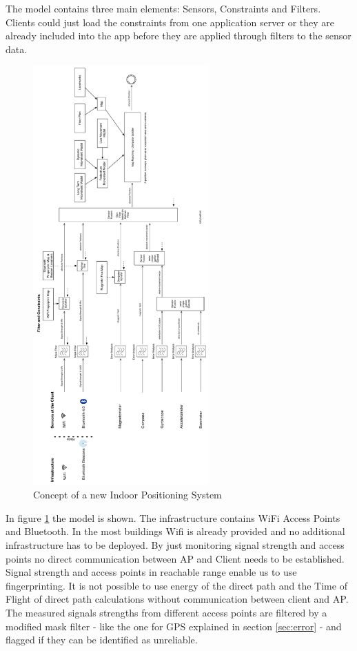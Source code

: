 The model contains three main elements: Sensors, Constraints and Filters. Clients could just load the constraints from one application server or they are already included into the app before they are applied through filters to the sensor data. 

\begin{figure}
	\centering
		\includegraphics[width=0.6\textwidth]{images/Final_Positioning_system.pdf}
	\caption{Concept of a new Indoor Positioning System}
	\label{fig:ips}
\end{figure}

In figure \ref{fig:ips} the model is shown. The infrastructure contains WiFi Access Points and Bluetooth. In the most buildings Wifi is already provided and no additional infrastructure has to be deployed. By just monitoring signal strength and access points no direct communication between AP and Client needs to be established. Signal strength and access points in reachable range enable us to use fingerprinting. It is not possible to use energy of the direct path and the Time of Flight of direct path calculations without communication between client and AP. 
The measured signals strengths from different access points are filtered by a modified mask filter - like the one for GPS explained in section \ref{sec:error} - and flagged if they can be identified as unreliable.

